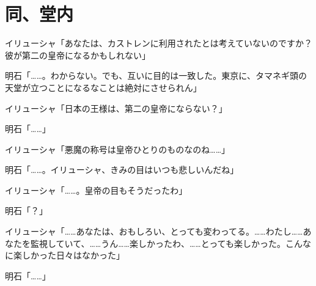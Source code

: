 \section*{同、堂内}

イリューシャ「あなたは、カストレンに利用されたとは考えていないのですか？　彼が第二の皇帝になるかもしれない」

明石「……。わからない。でも、互いに目的は一致した。東京に、タマネギ頭の天堂が立つことになるなことは絶対にさせられん」

イリューシャ「日本の王様は、第二の皇帝にならない？」

明石「……」

イリューシャ「悪魔の称号は皇帝ひとりのものなのね……」

明石「……。イリューシャ、きみの目はいつも悲しいんだね」

イリューシャ「……。皇帝の目もそうだったわ」

明石「？」

イリューシャ「……あなたは、おもしろい、とっても変わってる。……わたし……あなたを監視していて、……うん……楽しかったわ、……とっても楽しかった。こんなに楽しかった日々はなかった」

明石「……」
